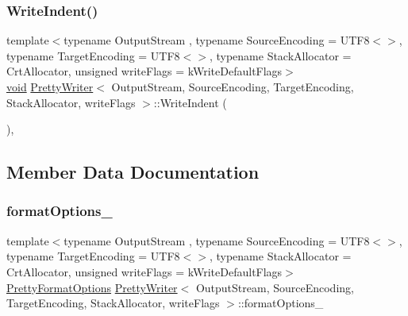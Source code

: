 \subsubsection{\texorpdfstring{Write\+Indent()}{WriteIndent()}}
{\footnotesize\ttfamily template$<$typename Output\+Stream , typename Source\+Encoding  = U\+T\+F8$<$$>$, typename Target\+Encoding  = U\+T\+F8$<$$>$, typename Stack\+Allocator  = Crt\+Allocator, unsigned write\+Flags = k\+Write\+Default\+Flags$>$ \\
\hyperlink{imgui__impl__opengl3__loader_8h_ac668e7cffd9e2e9cfee428b9b2f34fa7}{void} \hyperlink{classPrettyWriter}{Pretty\+Writer}$<$ Output\+Stream, Source\+Encoding, Target\+Encoding, Stack\+Allocator, write\+Flags $>$\+::Write\+Indent (\begin{DoxyParamCaption}{ }\end{DoxyParamCaption})\hspace{0.3cm}{\ttfamily [inline]}, {\ttfamily [protected]}}



\subsection{Member Data Documentation}
\mbox{\label{classPrettyWriter_a15505ed4ea0fa85d339b3a987f1a3aaf}} 
\subsubsection{\texorpdfstring{format\+Options\+\_\+}{formatOptions\_}}
{\footnotesize\ttfamily template$<$typename Output\+Stream , typename Source\+Encoding  = U\+T\+F8$<$$>$, typename Target\+Encoding  = U\+T\+F8$<$$>$, typename Stack\+Allocator  = Crt\+Allocator, unsigned write\+Flags = k\+Write\+Default\+Flags$>$ \\
\hyperlink{prettywriter_8h_a150fd6ef2dbf4025c33ece85451982d5}{Pretty\+Format\+Options} \hyperlink{classPrettyWriter}{Pretty\+Writer}$<$ Output\+Stream, Source\+Encoding, Target\+Encoding, Stack\+Allocator, write\+Flags $>$\+::format\+Options\+\_\+\hspace{0.3cm}{\ttfamily [protected]}}

\mbox{\label{classPrettyWriter_aaa3f6380daa8466a5101ed18fc33bf04}} 

